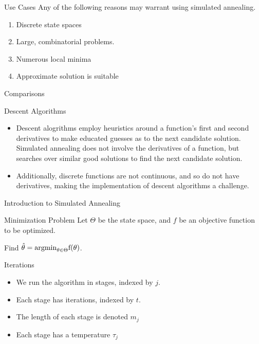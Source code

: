 \documentclass[{pdf, t}]{beamer}
\begin{document}
\begin{frame}{Use Cases}
Any of the following reasons may warrant using simulated annealing.
\begin{enumerate}
  \item Discrete state spaces
  \item Large, combinatorial problems.
  \item Numerous local minima
  \item Approximate solution is suitable
\end{enumerate}
\end{frame}

\begin{frame}{Comparisons}
\begin{block}{Descent Algorithms}
\begin{itemize}
\item {Descent alogrithms employ heuristics around a function's first and second derivatives to make educated guesses
as to the next candidate solution. Simulated annealing does not involve the derivatives of a function,
but searches over similar good solutions to find the next candidate solution.}
\item {Additionally, discrete functions are not continuous, and so do not have derivatives, making the
implementation of descent algorithms a challenge.}
\end{itemize}
\end{block}
\end{frame}


\begin{frame}{Introduction to Simulated Annealing}
\begin{block}{Minimization Problem}
Let $\Theta$ be the state space, and $f$ be an
objective function to be optimized.

Find $\hat{\theta} = \rm{argmin}_{\theta \in \Theta} f(\theta)$.
\end{block}

\begin{block}{Iterations}
\begin{itemize}
\item We run the algorithm in stages, indexed by $j$.
\item Each stage has iterations, indexed by $t$.
\item The length of each stage is denoted $m_j$
\item Each stage has a temperature $\tau_j$
\end{itemize}
\end{block}
\end{frame}
\end{document}
